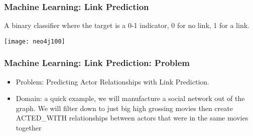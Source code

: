\begin{frame}[fragile]\frametitle{Machine Learning: Link Prediction}

A binary classifier where the target is a 0-1 indicator, 0 for no link, 1 for a link.

\begin{center}
\texttt{[image: neo4j100]}
\end{center}	

\end{frame}

\begin{frame}[fragile]\frametitle{Machine Learning: Link Prediction: Problem}

\begin{itemize}
\item Problem: Predicting Actor Relationships with Link Prediction.
\item Domain:  a quick example, we will manufacture a social network out of the graph. We will filter down to just big high grossing movies then create ACTED\_WITH relationships between actors that were in the same movies together
\end{itemize}


\end{frame}

